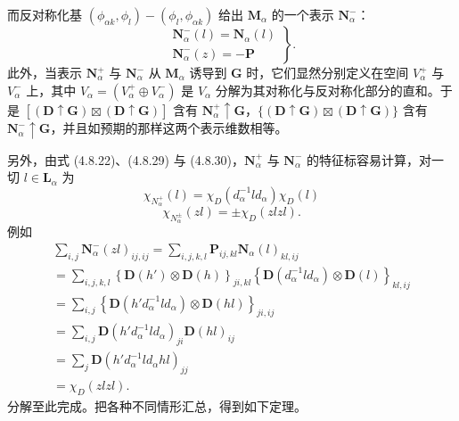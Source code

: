 而反对称化基 $(\phi_{\alpha k}, \phi_{l}) - (\phi_{l}, \phi_{\alpha k})$ 给出 $\mathbf{M}_{\alpha}$ 的一个表示 $\mathbf{N}^{-}_{\alpha}$：
\begin{equation*}
\left.
\begin{array}{l}
\mathbf{N}^{-}_{\alpha}(l) = \mathbf{N}_{\alpha}(l)\\
\mathbf{N}^{-}_{\alpha}(z) = -\mathbf{P}
\end{array}
\right\}.
\tag{4.8.30}
\end{equation*}
此外，当表示 $\mathbf{N}^{+}_{\alpha}$ 与 $\mathbf{N}^{-}_{\alpha}$ 从 $\mathbf{M}_{\alpha}$ 诱导到 $\mathbf{G}$ 时，它们显然分别定义在空间 $V^{+}_{\alpha}$ 与 $V^{-}_{\alpha}$ 上，其中 $V_{\alpha} = (V^{+}_{\alpha} \oplus V^{-}_{\alpha})$ 是 $V_{\alpha}$ 分解为其对称化与反对称化部分的直和。于是 $[(\mathbf{D} \uparrow \mathbf{G}) \boxtimes (\mathbf{D} \uparrow \mathbf{G})]$ 含有 $\mathbf{N}^{+}_{\alpha} \uparrow \mathbf{G}$，$\{(\mathbf{D} \uparrow \mathbf{G}) \boxtimes (\mathbf{D} \uparrow \mathbf{G})\}$ 含有 $\mathbf{N}^{-}_{\alpha} \uparrow \mathbf{G}$，并且如预期的那样这两个表示维数相等。

另外，由式 (4.8.22)、(4.8.29) 与 (4.8.30)，$\mathbf{N}^{+}_{\alpha}$ 与 $\mathbf{N}^{-}_{\alpha}$ 的特征标容易计算，对一切 $l \in \mathbf{L}_{\alpha}$ 为
\begin{equation*}
\chi_{N^{+}_{\alpha}}(l) = \chi_{D}(d^{-1}_{\alpha}ld_{\alpha})\chi_{D}(l)
\tag{4.8.31}
\end{equation*}
\begin{equation*}
\chi_{N^{\pm}_{\alpha}}(zl) = \pm\chi_{D}(zlzl).
\tag{4.8.32}
\end{equation*}
例如
\begin{equation*}
\begin{array}{l}
\sum_{i, j}\mathbf{N}^{-}_{\alpha}(zl)_{ij, ij} = \sum_{i, j, k, l}\mathbf{P}_{ij, kl}\mathbf{N}_{\alpha}(l)_{kl, ij}\\
= \sum_{i, j, k, l}\left\{\mathbf{D}(h') \otimes \mathbf{D}(h)\right\}_{ji, kl}\left\{\mathbf{D}(d^{-1}_{\alpha}ld_{\alpha}) \otimes \mathbf{D}(l)\right\}_{kl, ij}\\
= \sum_{i, j}\left\{\mathbf{D}(h'd^{-1}_{\alpha}ld_{\alpha}) \otimes \mathbf{D}(hl)\right\}_{ji, ij}\\
= \sum_{i, j}\mathbf{D}(h'd^{-1}_{\alpha}ld_{\alpha})_{ji}\mathbf{D}(hl)_{ij}\\
= \sum_{j}\mathbf{D}(h'd^{-1}_{\alpha}ld_{\alpha}hl)_{jj}\\
= \chi_{D}(zlzl).
\end{array}
\tag{4.8.33}
\end{equation*}
分解至此完成。把各种不同情形汇总，得到如下定理。

